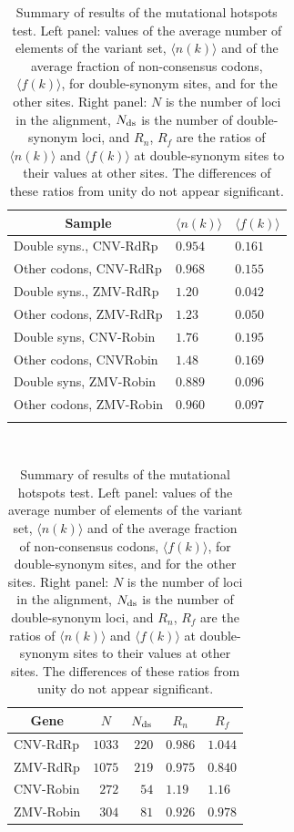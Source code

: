 \documentclass[unnumsec,webpdf,contemporary,large,namedate]{oup-authoring-template}%
\theoremstyle{thmstyleone}%
\theoremstyle{thmstyletwo}%
\theoremstyle{thmstylethree}%
\begin{document}
\begin{table}[h]
\caption{Summary of results of the mutational hotspots test. Left panel: values of the average number
of elements of the variant set, $\langle n(k)\rangle$ and of the average fraction of non-consensus
codons, $\langle f(k)\rangle$, for double-synonym sites,  and for the other sites.
Right panel: $N$ is the number of loci in the alignment, $N_{\rm ds}$ is the
number of double-synonym loci, and $R_n$, $R_f$ are the ratios of $\langle n(k)\rangle $
and $\langle f(k)\rangle$ at double-synonym sites to their values at other sites.
The differences of these ratios from unity do not appear significant.
\label{tab: 5.4}}
\begin{minipage}{0.45\textwidth}
\centering
\begin{tabular*}{\textwidth}{@{\extracolsep\fill}lll@{\extracolsep\fill}}
\toprule
\multicolumn{1}{c}{Sample}&
\multicolumn{1}{c}{$\langle n(k)\rangle$}&
\multicolumn{1}{c}{$\langle f(k)\rangle$}\\
\midrule
Double syns., CNV-RdRp  &$0.954$&$0.161$\\
Other codons, CNV-RdRp  &$0.968$&$0.155$\\
Double syns., ZMV-RdRp  &$1.20$&$0.042$\\
Other codons, ZMV-RdRp  &$1.23$&$0.050$\\
Double syns, CNV-Robin &$1.76$&$0.195$\\
Other codons, CNVRobin &$1.48$&$0.169$\\
Double syns, ZMV-Robin   &$0.889$&$0.096$\\
Other codons, ZMV-Robin &$0.960$&$0.097$\\
\botrule
\end{tabular*}
\end{minipage}
\begin{minipage}{0.10\textwidth}
$ $
\end{minipage}
\begin{minipage}{0.45\textwidth}
\centering
\begin{tabular*}{\textwidth}{@{\extracolsep\fill}lrrll@{\extracolsep\fill}}
\toprule
\multicolumn{1}{c}{Gene}&\multicolumn{1}{c}{$N$}&\multicolumn{1}{c}{$N_{\rm ds}$}
&\multicolumn{1}{c}{$R_n$}&\multicolumn{1}{c}{$R_f$}\\
\midrule
CNV-RdRp  &$1033$&$220$&$0.986$&$1.044$\\
ZMV-RdRp  &$1075$&$219$&$0.975$&$0.840$\\
CNV-Robin  &$272$&$54$&$1.19$&$1.16$\\
ZMV-Robin  &$304$&$81$&$0.926$&$0.978$\\
\midrule
\end{tabular*}
\end{minipage}
\end{table}
\end{document}
